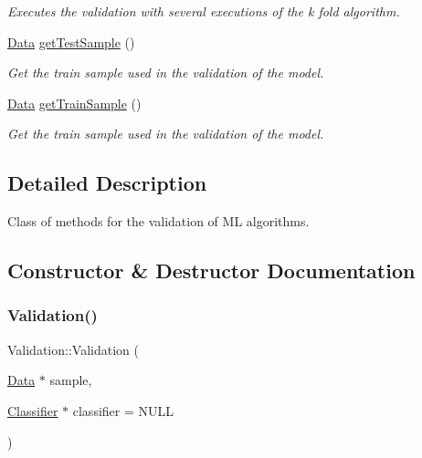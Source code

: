 \begin{DoxyCompactItemize}
\begin{DoxyCompactList}\small\item\em Executes the validation with several executions of the k fold algorithm. \end{DoxyCompactList}\item 
\hyperlink{class_data}{Data} \hyperlink{class_validation_a6ef1b8600535a064b9a94507afdf849c}{get\+Test\+Sample} ()
\begin{DoxyCompactList}\small\item\em Get the train sample used in the validation of the model. \end{DoxyCompactList}\item 
\hyperlink{class_data}{Data} \hyperlink{class_validation_a656f4919ec48a7f26063d046d583433a}{get\+Train\+Sample} ()
\begin{DoxyCompactList}\small\item\em Get the train sample used in the validation of the model. \end{DoxyCompactList}\end{DoxyCompactItemize}


\subsection{Detailed Description}
Class of methods for the validation of ML algorithms. 

\subsection{Constructor \& Destructor Documentation}
\mbox{\label{class_validation_a54a1ace2df11df3937c96cddd8b46f93}} 
\subsubsection{\texorpdfstring{Validation()}{Validation()}}
{\footnotesize\ttfamily Validation\+::\+Validation (\begin{DoxyParamCaption}\item[{\hyperlink{class_data}{Data} $\ast$}]{sample,  }\item[{\hyperlink{class_classifier}{Classifier} $\ast$}]{classifier = {\ttfamily NULL} }\end{DoxyParamCaption})}



